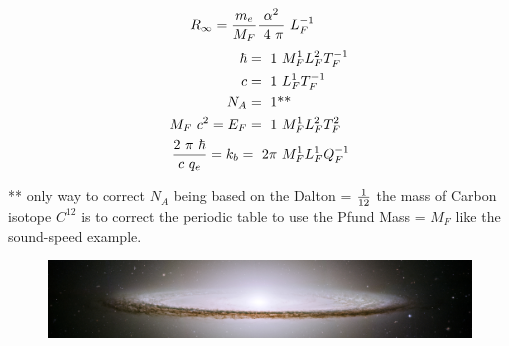 \begin{multicols}{2}
\begin{multicols}{2}[\setlength{\columnseprule}{0pt}]
\begin{align*}
R_\infty = {m_e\over M_F}{\alpha ^2\over~4~\pi}&~L_F^{-1}
\end{align*}\noindent\begin{align*}
\hbar = ~1 & ~M_F^{1}L_F^{2}T_F^{-1}\\
c = ~1 & ~L_F^{1}T_F^{-1}\\
N_A = ~1 &\text{**}\\
M_F~ c^2 =E_F = ~1 & ~M_F^{1}L_F^{2}T_F^{2}\\
{2~\pi~\hbar \over c ~ q_e}=k_b = ~2\pi & ~M_F^{1}L_F^{1}Q_F^{-1}
\end{align*}\noindent\end{multicols}\noindent
** only way to correct $N_A$ being based on the Dalton = ${1 \over 12}$ the mass of Carbon isotope $C^{12}$ is to correct the periodic table to use the Pfund Mass = $M_F$ like the sound-speed example.
\pagebreak
\end{multicols}
\begin{figure}[h]
  \centering
  \includegraphics[width=\textwidth]{UWsombrero.jpg}
\end{figure}
